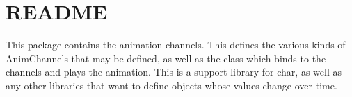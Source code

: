 \chapter{README}
\hypertarget{md_panda_2src_2chan_2README}{}\label{md_panda_2src_2chan_2README}
This package contains the animation channels. This defines the various kinds of Anim\+Channels that may be defined, as well as the  class which binds to the channels and plays the animation. This is a support library for char, as well as any other libraries that want to define objects whose values change over time. 